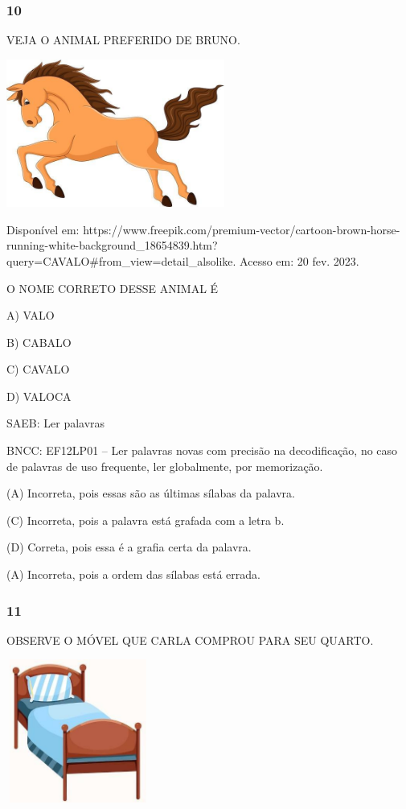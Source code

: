 \subsubsection{10}\label{section-66}

VEJA O ANIMAL PREFERIDO DE BRUNO.

\includegraphics[width=2.82210in,height=1.90975in]{media/image234.jpg}

Disponível
em: https://www.freepik.com/premium-vector/cartoon-brown-horse-running-white-background\_18654839.htm?query=CAVALO\#from\_view=detail\_alsolike. Acesso em: 20 fev. 2023.

O NOME CORRETO DESSE ANIMAL É

A) VALO

B) CABALO

C) CAVALO

D) VALOCA

SAEB: Ler palavras

BNCC: EF12LP01 -- Ler palavras novas com precisão na decodificação, no caso de palavras de uso frequente, ler globalmente, por memorização.

(A) Incorreta, pois essas são as últimas sílabas da palavra.

(C) Incorreta, pois a palavra está grafada com a letra b.

(D) Correta, pois essa é a grafia certa da palavra.

(A) Incorreta, pois a ordem das sílabas está errada. \protect\hypertarget{_heading=h.oxa1c0ljwovb}{}{}

\subsubsection{11}\label{section-67}

OBSERVE O MÓVEL QUE CARLA COMPROU PARA SEU QUARTO.

\includegraphics[width=1.84783in,height=1.84783in]{media/image235.jpg}

